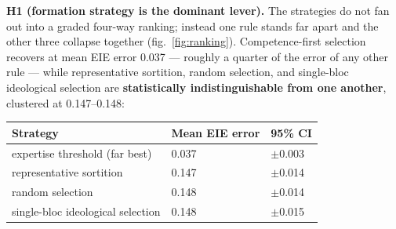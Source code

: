 \documentclass[
]{article}
\newcounter{none} %
\begin{document}
\textbf{H1 (formation strategy is the dominant lever).} The strategies
do not fan out into a graded four-way ranking; instead one rule stands
far apart and the other three collapse together
(fig.~\ref{fig:ranking}). Competence-first selection recovers at mean
EIE error 0.037 --- roughly a quarter of the error of any other rule ---
while representative sortition, random selection, and single-bloc
ideological selection are \textbf{statistically indistinguishable from
one another}, clustered at 0.147--0.148:

{\def\LTcaptype{none} %
\begin{longtable}[]{@{}lll@{}}
\toprule\noalign{}
Strategy & Mean EIE error & 95\% CI \\
\midrule\noalign{}
\endhead
\bottomrule\noalign{}
\endlastfoot
expertise threshold (far best) & 0.037 & \texorpdfstring{\ensuremath{\pm}}{+/-}0.003 \\
representative sortition & 0.147 & \texorpdfstring{\ensuremath{\pm}}{+/-}0.014 \\
random selection & 0.148 & \texorpdfstring{\ensuremath{\pm}}{+/-}0.014 \\
single-bloc ideological selection & 0.148 & \texorpdfstring{\ensuremath{\pm}}{+/-}0.015 \\
\end{longtable}
}
\end{document}

